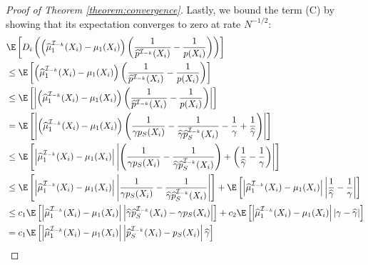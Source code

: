 \begin{appendix}
\begin{proof}[Proof of Theorem \ref{theorem:convergence}]
    Lastly, we bound the term (C) by showing that its expectation converges to zero at rate $N^{-1/2}$:
    \begin{align}
        \begin{split}
            &\E\left[D_i \left(\left(\widehat\mu^{\mathcal{I}_{-k}}_1(X_i)  - \mu_1(X_i)\right) \left( \frac{1}{\widehat{p}^{\mathcal{I}_{-k}}(X_i)} - \frac{1}{p(X_i)}\right) \right) \right]\\
            & \leq \E\left[\left(\widehat\mu^{\mathcal{I}_{-k}}_1(X_i)  - \mu_1(X_i)\right) \left( \frac{1}{\widehat{p}^{\mathcal{I}_{-k}}(X_i)} - \frac{1}{p(X_i)}\right) \right]\\
            & \leq \E\left[\left\vert \left(\widehat\mu^{\mathcal{I}_{-k}}_1(X_i)  - \mu_1(X_i)\right) \left( \frac{1}{\widehat{p}^{\mathcal{I}_{-k}}(X_i)} - \frac{1}{p(X_i)}\right) \right\vert\right]\\
            &= \E\left[\left\vert \left(\widehat\mu^{\mathcal{I}_{-k}}_1(X_i)  - \mu_1(X_i)\right) \left(\frac{1}{\gamma p_S(X_i)} - \frac{1}{\widehat{\gamma}\widehat{p}_S^{\mathcal{I}_{-k}}(X_i)} -\frac{1}{\gamma} + \frac{1}{\widehat{\gamma}}\right) \right\vert\right]\\
            &\leq \E\left[\left\vert \widehat\mu^{\mathcal{I}_{-k}}_1(X_i)  - \mu_1(X_i)\right\vert \left\vert \left(\frac{1}{\gamma p_S(X_i)} - \frac{1}{\widehat{\gamma}\widehat{p}_S^{\mathcal{I}_{-k}}(X_i)}\right) + \left(\frac{1}{\widehat{\gamma}}-\frac{1}{\gamma}\right) \right\vert\right]\\
            &\leq \E\left[\left\vert \widehat\mu^{\mathcal{I}_{-k}}_1(X_i)  - \mu_1(X_i)\right\vert \left\vert \frac{1}{\gamma p_S(X_i)} - \frac{1}{\widehat{\gamma}\widehat{p}_S^{\mathcal{I}_{-k}}(X_i)}\right\vert\right] + \E\left[\left\vert \widehat\mu^{\mathcal{I}_{-k}}_1(X_i)  - \mu_1(X_i)\right\vert \left\vert \frac{1}{\widehat{\gamma}}-\frac{1}{\gamma}\right\vert\right]\\
            &\leq c_1 \E\left[\left\vert \widehat\mu^{\mathcal{I}_{-k}}_1(X_i)  - \mu_1(X_i)\right\vert \left\vert \widehat{\gamma}\widehat{p}_S^{\mathcal{I}_{-k}}(X_i)-\gamma p_S(X_i)\right\vert\right] + c_2 \E\left[\left\vert \widehat\mu^{\mathcal{I}_{-k}}_1(X_i)  - \mu_1(X_i)\right\vert \left\vert \gamma-\widehat{\gamma}\right\vert\right]\\
            &=c_1 \E\left[\left\vert \widehat\mu^{\mathcal{I}_{-k}}_1(X_i)  - \mu_1(X_i)\right\vert \left\vert \widehat{p}_S^{\mathcal{I}_{-k}}(X_i)- p_S(X_i)\right\vert \widehat{\gamma} \right] \\

\end{split}
\end{align}
\end{proof}
\end{appendix}

